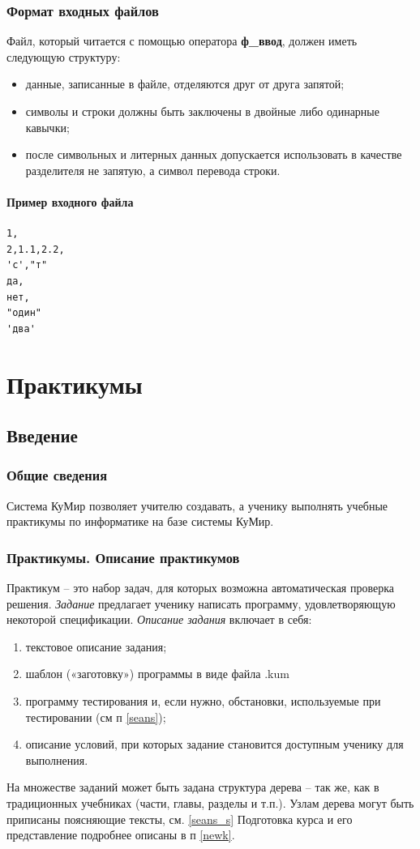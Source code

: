 \subsection{Формат входных файлов}
\label{input-file}

Файл, который читается с помощью оператора \textbf{ф\_ввод}, должен иметь следующую структуру:
\begin{itemize}
\item данные, записанные в файле, отделяются друг от друга запятой;
\item символы и строки должны быть заключены в двойные либо одинарные кавычки;
\item после символьных и литерных данных допускается использовать в качестве разделителя не запятую, а символ перевода строки.
\end{itemize}

\subsubsection{Пример входного файла}
\begin{verbatim}
1,
2,1.1,2.2,
'с',"т"
да,
нет,
"один"
'два'
\end{verbatim}





\chapter {Практикумы}
\section {Введение}
\subsection {Общие сведения}
	Система КуМир позволяет учителю создавать, а ученику выполнять учебные практикумы по информатике на базе системы КуМир. 
\subsection {Практикумы. Описание практикумов}
	Практикум – это набор задач, для которых возможна автоматическая проверка решения. 
	\emph{Задание} предлагает ученику написать программу, удовлетворяющую некоторой спецификации. \emph{Описание задания} включает в себя:
		\begin{enumerate}
		\item	 текстовое описание задания;
		\item	 шаблон («заготовку») программы в виде файла .kum 
		\item	 программу тестирования и, если нужно, обстановки, используемые при тестировании (см п \ref{seans});
		\item	 описание условий, при которых задание становится доступным ученику для выполнения.
	\end{enumerate}
	На множестве заданий может быть задана структура дерева – так же, как в традиционных учебниках (части, главы, разделы и т.п.). 
	Узлам дерева могут быть приписаны поясняющие тексты, см. \ref{seans_s}
	Подготовка курса и его представление подробнее описаны в п \ref{newk}. 


